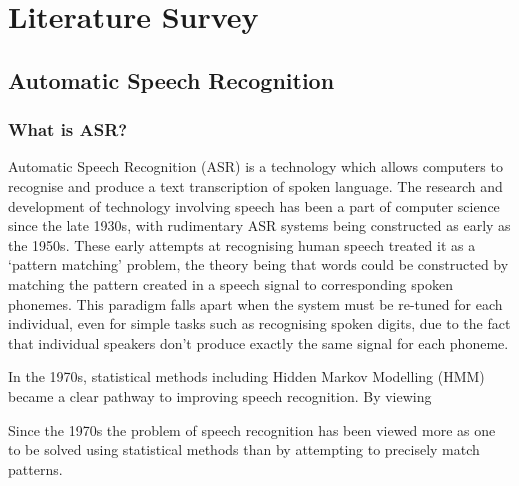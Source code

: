 \chapter{Literature Survey}\label{ch:literature-survey}

\section{Automatic Speech Recognition}\label{sec:what-is-asr}

\subsection{What is ASR?}

Automatic Speech Recognition (ASR) is a technology which allows computers to recognise and produce a text transcription of spoken language.
The research and development of technology involving speech has been a part of computer science since the late 1930s\cite{Rabiner2004Jan,vocoder}, with rudimentary ASR systems being constructed as early as the 1950s\cite{asr-52}.
These early attempts at recognising human speech treated it as a `pattern matching' problem, the theory being that words could be constructed by matching the pattern created in a speech signal to corresponding spoken phonemes\cite{Rabiner2004Jan}. 
This paradigm falls apart when the system must be re-tuned for each individual, even for simple tasks such as recognising spoken digits\cite{asr-52}, due to the fact that individual speakers don't produce exactly the same signal for each phoneme\cite{Horton2010}.


In the 1970s, statistical methods including Hidden Markov Modelling (HMM) became a clear pathway to improving speech recognition.
By viewing 

Since the 1970s the problem of speech recognition has been viewed more as one to be solved using statistical methods than by attempting to precisely match patterns\cite{Rabiner2004Jan}.


